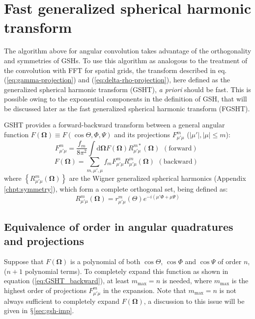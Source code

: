 \section{Fast generalized spherical harmonic transform\label{sec:fgsht}}

The algorithm above for angular convolution takes advantage of the
orthogonality and symmetries of \acs{GSH}s. To use this algorithm
as analogous to the treatment of the convolution with \acs{FFT} for
spatial grids, the transform described in eq. (\ref{eq:gamma-projection})
and (\ref{eq:delta-rho-projection}), here defined as the generalized
spherical harmonic transform (\acs{GSHT}), \textit{a priori }should
be fast. This is possible owing to the exponential components in the
definition of \acs{GSH}, that will be discussed later as the fast
generalized spherical harmonic transform (\acs{FGSHT}).

\acs{GSHT} provides a forward-backward transform between a general
angular function $F(\mathbf{\Omega})\equiv F(\cos\Theta,\Phi,\Psi)$
and its projections $F_{\mu'\mu}^{m}$ ($\left|\mu'\right|,\left|\mu\right|\leq m$):
\begin{equation}
F_{\mu'\mu}^{m}=\frac{f_{m}}{8\pi^{2}}\int\mathrm{d}\mathbf{\Omega}F(\mathbf{\Omega})R_{\mu'\mu}^{m*}(\mathbf{\Omega})\begin{array}{c}
\mathrm{(forward)}\end{array}\label{eq:GSHT_forward}
\end{equation}
\begin{equation}
F(\mathbf{\Omega})=\sum_{m,\mu',\mu}f_{m}F_{\mu'\mu}^{m}R_{\mu'\mu}^{m}(\mathbf{\Omega})\begin{array}{c}
\mathrm{(backward)}\end{array}\label{eq:GSHT_backward}
\end{equation}
where $\left\{ R_{\mu'\mu}^{m}(\mathbf{\Omega})\right\} $ are the
Wigner generalized spherical harmonics (Appendix \ref{chpt:symmetry}),
which form a complete orthogonal set, being defined as:
\begin{equation}
R_{\mu'\mu}^{m}(\mathbf{\Omega})=r_{\mu'\mu}^{m}(\Theta)e^{-i(\mu'\Phi+\mu\Psi)}
\end{equation}


\subsection{Equivalence of order in angular quadratures and projections}

Suppose that $F(\mathbf{\Omega})$ is a polynomial of both $\cos\Theta$,
$\cos\Phi$ and $\cos\Psi$ of order $n$, ($n+1$ polynomial terms).
To completely expand this function as shown in equation (\ref{eq:GSHT_backward}),
at least $m_{\mathrm{max}}=n$ is needed, where $m_{\mathrm{max}}$
is the highest order of projections $F_{\mu'\mu}^{m}$ in the expansion.
Note that $m_{\mathrm{max}}=n$ is not always sufficient to completely
expand $F(\mathbf{\Omega})$, a discussion to this issue will be given
in $\mathsection$\ref{sec:gsh-imp}. 

